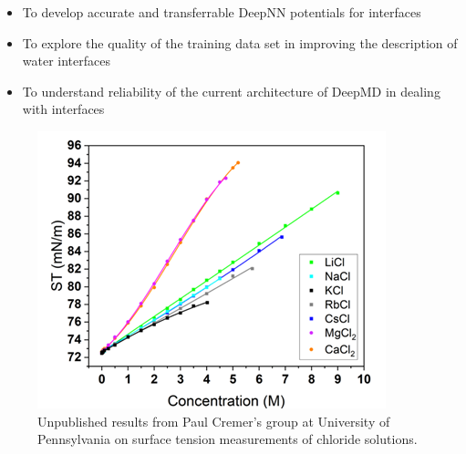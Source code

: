 \begin{itemize}
    \item To develop accurate and transferrable DeepNN potentials for
          interfaces
    \item To explore the quality of the training data set in improving the
          description of water interfaces
    \item To understand reliability of the current architecture of DeepMD in
          dealing with interfaces
\end{itemize}

\begin{figure}[tbhp!]
    \centering
    \includegraphics[width=0.75\linewidth]{images/ST_solute.png}
    \caption{Unpublished results from Paul Cremer's group at University of
        Pennsylvania  on surface tension measurements of chloride solutions.}
    \label{fig:surf_tens_solute}
\end{figure}